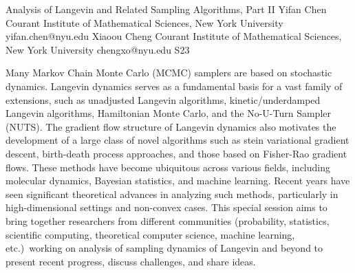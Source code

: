 

\clearpage

\begin{session}
 {Analysis of Langevin and Related Sampling Algorithms, Part II}%
 {Yifan Chen}%
 {Courant Institute of Mathematical Sciences, New York University}%
 {yifan.chen@nyu.edu}%
 {Xiaoou Cheng}%
 {Courant Institute of Mathematical Sciences, New York University}%
 {chengxo@nyu.edu}%
 {S23}%
 {}%

 Many Markov Chain Monte Carlo (MCMC) samplers are based on stochastic dynamics. Langevin dynamics serves as a fundamental basis for a vast family of extensions, such as unadjusted Langevin algorithms, kinetic/underdamped Langevin algorithms, Hamiltonian Monte Carlo, and the No-U-Turn Sampler (NUTS). The gradient flow structure of Langevin dynamics also motivates the development of a large class of novel algorithms such as stein variational gradient descent, birth-death process approaches, and those based on Fisher-Rao gradient flows. These methods have become ubiquitous across various fields, including molecular dynamics, Bayesian statistics, and machine learning. Recent years have seen significant theoretical advances in analyzing such methods, particularly in high-dimensional settings and non-convex cases. This special session aims to bring together researchers from different communities (probability, statistics, scientific computing, theoretical computer science, machine learning, etc.)\ working on analysis of sampling dynamics of Langevin and beyond to present recent progress, discuss challenges, and share ideas.
\end{session}



\clearpage


